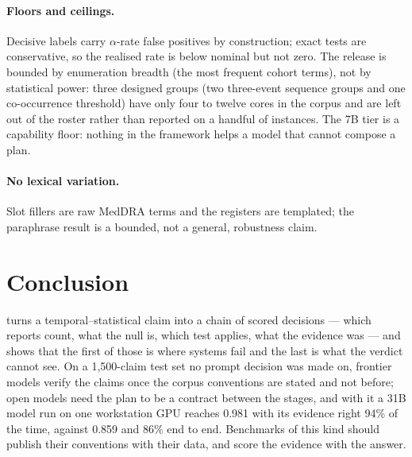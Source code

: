 \paragraph{Floors and ceilings.} Decisive labels carry $\alpha$-rate false
positives by construction; exact tests are conservative, so the realised rate
is below nominal but not zero. The release is bounded by enumeration breadth
(the most frequent cohort terms), not by statistical power: three designed
groups (two three-event sequence groups and one co-occurrence threshold) have
only four to twelve cores in the corpus and are left out of the roster
rather than reported on a handful of instances. The 7B tier is a capability
floor: nothing in the framework helps a model that cannot compose a plan.

\paragraph{No lexical variation.} Slot fillers are raw MedDRA terms and the
registers are templated; the paraphrase result is a bounded, not a general,
robustness claim.

\section{Conclusion}
\label{sec:conclusion}

\sys{} turns a temporal--statistical claim into a chain of scored decisions ---
which reports count, what the null is, which test applies, what the evidence
was --- and shows that the first of those is where systems fail and the last is
what the verdict cannot see. On a 1{,}500-claim test set no prompt decision
was made on, frontier models verify the claims once the corpus conventions are
stated and not before; open models need the plan to be a contract between the
stages, and with it a 31B model run on one workstation GPU reaches 0.981 with
its evidence right 94\% of the time, against 0.859 and 86\% end to end.
Benchmarks of this kind should publish their conventions with their data, and
score the evidence with the answer.
